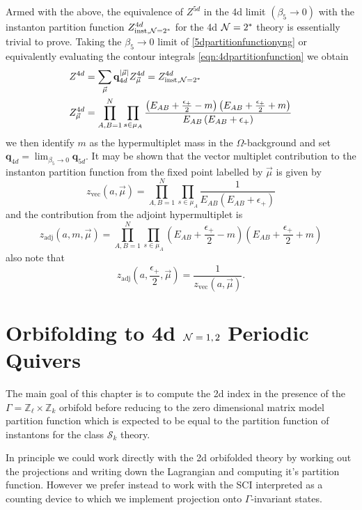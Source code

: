 \documentclass[main.tex]{subfiles}
\begin{document}
Armed with the above, the equivalence of $Z^{5d}$ in the 4d limit $(\beta_5\to0)$ with the instanton partition function $Z^{4d}_{\text{inst},\mathcal{N}=2^*}$ for the 4d $\mathcal{N}=2^*$ theory is essentially trivial to prove. Taking the $\beta_5\to0$ limit of \eqref{5dpartitionfunctionyng} or equivalently evaluating the contour integrals \eqref{eqn:4dpartitionfunction} we obtain
\begin{align}
&Z^{4d}=\sum_{\vec{\mu}}\mathbf{q}_{4d}^{|\vec{\mu}|}Z_{\vec{\mu}}^{4d}=Z^{4d}_{\text{inst},\mathcal{N}=2^*}\\
&Z_{\vec{\mu}}^{4d}=\prod_{A,B=1}^N\prod_{s\in \mu_A}\frac{\left(E_{AB}+\frac{\epsilon_+}{2}-m\right)\left(E_{AB}+\frac{\epsilon_+}{2}+m\right)}{E_{AB}\left(E_{AB}+\epsilon_+\right)}
\end{align}
we then identify $m$ as the hypermultiplet mass in the $\Omega$-background \cite{Okuda:2010ke} and set $\mathbf{q}_{4d}=\lim_{\beta_5\to0}\mathbf{q}_{5d}$.
It may be shown \cite{Bruzzo:2002xf,Shadchin:2005mx,Shadchin:2005cc} that the vector multiplet contribution to the instanton partition function from the fixed point labelled by $\vec{\mu}$ is given by
\begin{equation}\label{eqn:zvec}
z_{\text{vec}}(a,\vec{\mu})=\prod_{A,B=1}^N\prod_{s\in \mu_A}\frac{1}{E_{AB}\left(E_{AB}+\epsilon_+\right)}
\end{equation}
and the contribution from the adjoint hypermultiplet is
\begin{equation}
z_{\text{adj}}(a,m,\vec{\mu})=\prod_{A,B=1}^N\prod_{s\in \mu_A}\left(E_{AB}+\frac{\epsilon_+}{2}-m\right)\left(E_{AB}+\frac{\epsilon_+}{2}+m\right)
\end{equation}
also note that
\begin{equation}
z_{\text{adj}}\left(a,\frac{\epsilon_+}{2},\vec{\mu}\right)=\frac{1}{z_{\text{vec}}(a,\vec{\mu})}.
\end{equation}

\section{Orbifolding to 4d \texorpdfstring{$\mathcal{N}=1,2$}{N=1,2} Periodic Quivers}\label{sec:Orbifolding}
The main goal of this chapter is to compute the 2d index in the presence of the $\Gamma=\mathbb{Z}_{\ell}\times\mathbb{Z}_k$ orbifold before reducing to the zero dimensional matrix model partition function which is expected to be equal to the partition function of instantons for the class $\mathcal{S}_k$ theory.

In principle we could work directly with the 2d orbifolded theory by working out the projections and writing down the Lagrangian and computing it's partition function. However we prefer instead to work with the SCI interpreted as a counting device to which we implement projection onto $\Gamma$-invariant states. 
\end{document}
